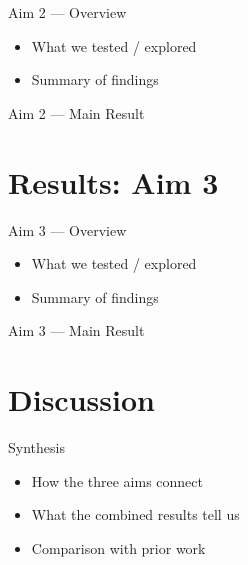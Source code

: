 \documentclass[aspectratio=169,11pt]{beamer}
\begin{document}
\begin{frame}{Aim 2 — Overview}
  \begin{itemize}
    \item What we tested / explored
    \item Summary of findings
  \end{itemize}
\end{frame}

\begin{frame}{Aim 2 — Main Result}
  \begin{center}
  \end{center}
\end{frame}

\section{Results: Aim 3}

\begin{frame}{Aim 3 — Overview}
  \begin{itemize}
    \item What we tested / explored
    \item Summary of findings
  \end{itemize}
\end{frame}

\begin{frame}{Aim 3 — Main Result}
  \begin{center}
  \end{center}
\end{frame}

\section{Discussion}

\begin{frame}{Synthesis}
  \begin{itemize}
    \item How the three aims connect
    \item What the combined results tell us
    \item Comparison with prior work
  \end{itemize}
\end{frame}
\end{document}
